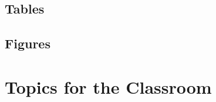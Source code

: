 \subsection{Tables}


\subsection{Figures}


\section{Topics for the Classroom}

\begin{enumerate}

\end{enumerate}




\begin{thebibliography}{00}

\end{thebibliography}


